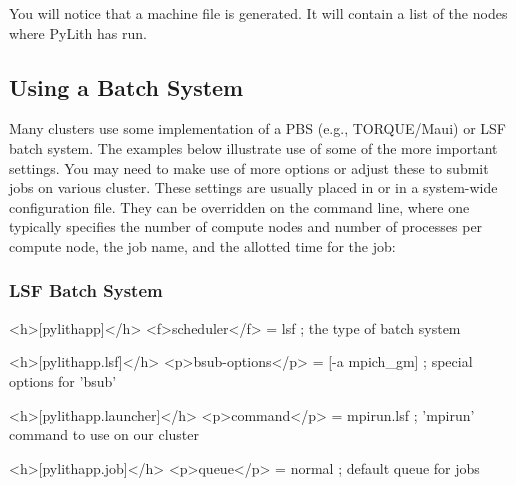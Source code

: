 You will notice that a machine file  is generated.
It will contain a list of the nodes where PyLith has run.

\subsection{Using a Batch System}

Many clusters use some implementation of a PBS (e.g., TORQUE/Maui)
or LSF batch system. The examples below illustrate use of some of
the more important settings. You may need to make use of more options
or adjust these to submit jobs on various cluster. These settings
are usually placed in 
or in a system-wide configuration file. They can be overridden on
the command line, where one typically specifies the number of compute
nodes and number of processes per compute node, the job name, and
the allotted time for the job:


\subsubsection{LSF Batch System}
\begin{cfg}
<h>[pylithapp]</h>
<f>scheduler</f> = lsf    ; the type of batch system

<h>[pylithapp.lsf]</h>
<p>bsub-options</p> = [-a mpich_gm]    ; special options for 'bsub'

<h>[pylithapp.launcher]</h>
<p>command</p> = mpirun.lsf    ; 'mpirun' command to use on our cluster

<h>[pylithapp.job]</h>
<p>queue</p> = normal    ; default queue for jobs
\end{cfg}

